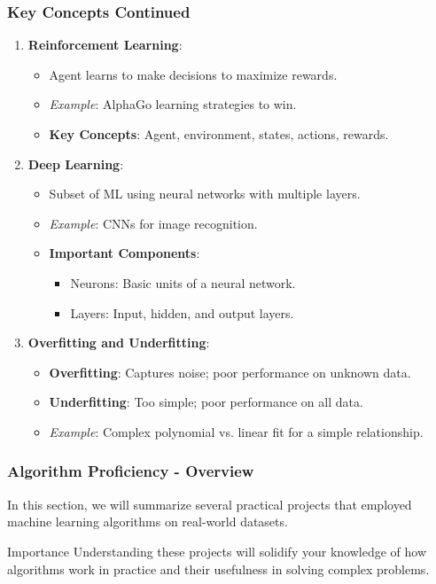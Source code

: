 \documentclass[aspectratio=169]{beamer}
\begin{document}
\begin{frame}[fragile]
    \frametitle{Key Concepts Continued}
    
    \begin{enumerate}[resume]
        \item \textbf{Reinforcement Learning}:
        \begin{itemize}
            \item Agent learns to make decisions to maximize rewards.
            \item \textit{Example}: AlphaGo learning strategies to win.
            \item \textbf{Key Concepts}: Agent, environment, states, actions, rewards.
        \end{itemize}
        
        \item \textbf{Deep Learning}:
        \begin{itemize}
            \item Subset of ML using neural networks with multiple layers.
            \item \textit{Example}: CNNs for image recognition.
            \item \textbf{Important Components}:
            \begin{itemize}
                \item Neurons: Basic units of a neural network.
                \item Layers: Input, hidden, and output layers.
            \end{itemize}
        \end{itemize}
        
        \item \textbf{Overfitting and Underfitting}:
        \begin{itemize}
            \item \textbf{Overfitting}: Captures noise; poor performance on unknown data.
            \item \textbf{Underfitting}: Too simple; poor performance on all data.
            \item \textit{Example}: Complex polynomial vs. linear fit for a simple relationship.
        \end{itemize}
    \end{enumerate}
\end{frame}

\begin{frame}[fragile]
    \frametitle{Algorithm Proficiency - Overview}
    In this section, we will summarize several practical projects that employed machine learning algorithms on real-world datasets. 
    \begin{block}{Importance}
        Understanding these projects will solidify your knowledge of how algorithms work in practice and their usefulness in solving complex problems.
    \end{block}
\end{frame}
\end{document}

